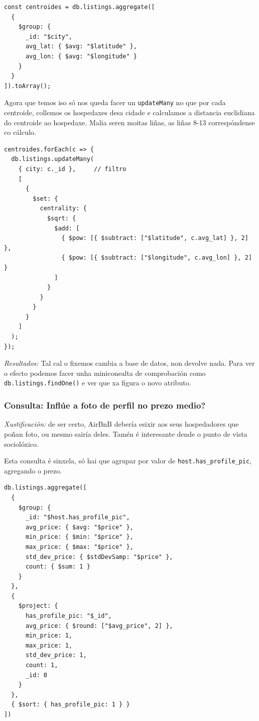 \documentclass[12pt,a4paper]{article}
\begin{document}
\begin{lstlisting}
const centroides = db.listings.aggregate([
  {
    $group: {
      _id: "$city",
      avg_lat: { $avg: "$latitude" },
      avg_lon: { $avg: "$longitude" }
    }
  }
]).toArray();
\end{lstlisting}

Agora que temos iso só nos queda facer un \texttt{updateMany} no que por cada centroide, collemos os hospedaxes desa cidade e calculamos a distancia euclidiana do centroide ao hospedaxe. Malia seren moitas liñas, as liñas 8-13 correspóndense co cálculo.

\begin{lstlisting}
centroides.forEach(c => {
  db.listings.updateMany(
    { city: c._id },     // filtro
    [
      {
        $set: {
          centrality: {
            $sqrt: {
              $add: [
                { $pow: [{ $subtract: ["$latitude", c.avg_lat] }, 2] },
                { $pow: [{ $subtract: ["$longitude", c.avg_lon] }, 2] }
              ]
            }
          }
        }
      }
    ]
  );
});
\end{lstlisting}

\emph{Resultados:} Tal cal o fixemos cambia a base de datos, non devolve nada. Para ver o efecto podemos facer unha miniconsulta de comprobación como \texttt{db.listings.findOne()} e ver que xa figura o novo atributo.


\subsubsection{Consulta: Inflúe a foto de perfil no prezo medio?}

\emph{Xustificación:} de ser certo, AirBnB debería esixir aos seus hospedadores que poñan foto, ou mesmo sairía deles. Tamén é interesante dende o punto de vista sociolóxico.

Esta consulta é sinxela, só hai que agrupar por valor de \texttt{host.has\_profile\_pic}, agregando o prezo.

\begin{lstlisting}
db.listings.aggregate([
  {
    $group: {
      _id: "$host.has_profile_pic",
      avg_price: { $avg: "$price" },
      min_price: { $min: "$price" },
      max_price: { $max: "$price" },
      std_dev_price: { $stdDevSamp: "$price" },
      count: { $sum: 1 }
    }
  },
  {
    $project: {
      has_profile_pic: "$_id",
      avg_price: { $round: ["$avg_price", 2] },
      min_price: 1,
      max_price: 1,
      std_dev_price: 1,
      count: 1,
      _id: 0
    }
  },
  { $sort: { has_profile_pic: 1 } }
])
\end{lstlisting}
\end{document}
